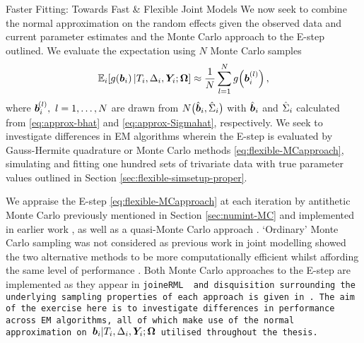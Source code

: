 \begin{chapter}{\label{cha:flexible}Faster Fitting: Towards Fast \& Flexible Joint Models}
We now seek to combine the normal approximation on the random effects given the observed data and current parameter estimates and the Monte Carlo approach to the E-step outlined. We evaluate the expectation using $N$ Monte Carlo samples 
\begin{equation}
    \mathbb{E}_i\!\left[ g\!\left(\bm{b}_i\right)|T_i,\Delta_i,\bm{Y}_i;\bm{\mathrm{\Omega}}\right]\approx\frac{1}{N}\sum_{l=1}^Ng\!\left(\bm{b}_i^{(l)}\right),
\label{eq:flexible-MCapproach}
\end{equation}
where $\bm{b}_i^{\!\left( l\right)},\ l=1,\dots,N$ are drawn from $N\big(\hat{\bm{b}}_i,\hat{\Sigma}_i\big)$ with $\hat{\bm{b}}_i$ and $\hat{\Sigma}_i$ calculated from \eqref{eq:approx-bhat} and \eqref{eq:approx-Sigmahat}, respectively. We seek to investigate differences in EM algorithms wherein the E-step is evaluated by Gauss-Hermite quadrature or Monte Carlo methods \eqref{eq:flexible-MCapproach}, simulating and fitting one hundred sets of trivariate data with true parameter values outlined in Section \ref{sec:flexible-simsetup-proper}. 

We appraise the E-step \eqref{eq:flexible-MCapproach} at each iteration by antithetic Monte Carlo previously mentioned in Section \ref{sec:numint-MC} and implemented in earlier work \citep{Henderson2000}, as well as a quasi-Monte Carlo approach \citep{Philipson2020}. `Ordinary' Monte Carlo sampling was not considered as previous work in joint modelling showed the two alternative methods to be more computationally efficient whilst affording the same level of performance \citep{Philipson2020}. Both Monte Carlo approaches to the E-step are implemented as they appear in \tt{joineRML} \citep{Hickey2018} and disquisition surrounding the underlying sampling properties of each approach is given in \citet{Philipson2020}. The aim of the exercise here is to investigate differences in performance across EM algorithms, all of which make use of the normal approximation on $\bm{b}_i|T_i,\Delta_i,\bm{Y}_i;\bm{\mathrm{\Omega}}$ utilised throughout the thesis.


\end{chapter}
